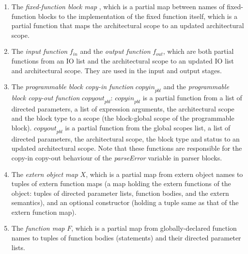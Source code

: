 \documentclass[UTF8]{article}
\begin{document}
\begin{enumerate}
\item The \emph{fixed-function block map} \ffbm{}, which is a partial map between names of fixed-function blocks to the implementation of the fixed function itself, which is a partial function that maps the architectural scope to an updated architectural scope.
\item The \emph{input function} $f_{ \mathit{in} }$ and the \emph{output function} $f_{ \mathit{out} }$, which are both partial functions from an IO list and the architectural scope to an updated IO list and architectural scope. They are used in the input and output stages.
\item The \emph{programmable block copy-in function} $\mathit{copyin}_{ \mathit{pbl} }$ and the \emph{programmable block copy-out function} $\mathit{copyout}_{ \mathit{pbl} }$: $\mathit{copyin}_{ \mathit{pbl} }$ is a partial function from a list of directed parameters, a list of expression arguments, the architectural scope and the block type to a scope (the block-global scope of the programmable block). $\mathit{copyout}_{ \mathit{pbl} }$ is a partial function from the global scopes list, a list of directed parameters, the architectural scope, the block type and status to an updated architectural scope. Note that these functions are responsible for the copy-in copy-out behaviour of the \textit{parseError} variable in parser blocks.
\item The \emph{extern object map} $X$, which is a partial map from extern object names to tuples of extern function maps (a map holding the extern functions of the object: tuples of directed parameter lists, function bodies, and the extern semantics), and an optional constructor (holding a tuple same as that of the extern function map).
\item The \emph{function map} $F$, which is a partial map from globally-declared function names to tuples of function bodies (statements) and their directed parameter lists.
\end{enumerate}
\end{document}

